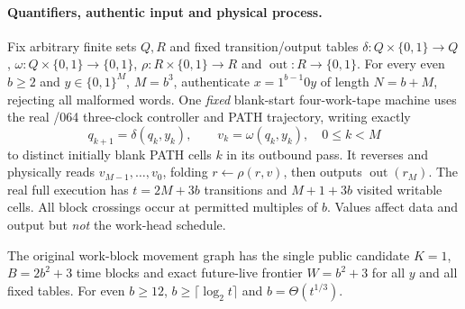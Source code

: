 \documentclass[11pt]{article}
\begin{document}
\paragraph{Quantifiers, authentic input and physical process.}
Fix arbitrary finite sets $Q,R$ and fixed transition/output tables
$\delta:Q\times\{0,1\}\to Q$,
$\omega:Q\times\{0,1\}\to\{0,1\}$,
$\rho:R\times\{0,1\}\to R$ and
$\operatorname{out}:R\to\{0,1\}$. For every even $b\ge2$ and
$y\in\{0,1\}^{M}$, $M=b^3$, authenticate
$x=1^{b-1}0y$ of length $N=b+M$, rejecting all malformed words.
One \emph{fixed} blank-start four-work-tape machine uses the real
/064 three-clock controller and PATH trajectory, writing exactly
\[
q_{k+1}=\delta(q_k,y_k),\qquad
v_k=\omega(q_k,y_k),\quad 0\le k<M
\]
to distinct initially blank PATH cells $k$ in its outbound pass.
It reverses and physically reads $v_{M-1},\ldots,v_0$,
folding $r\leftarrow\rho(r,v)$, then outputs
$\operatorname{out}(r_M)$. The real full execution has
$t=2M+3b$ transitions and $M+1+3b$ visited writable cells.
All block crossings occur at permitted multiples of $b$.
Values affect data and output but \emph{not} the work-head schedule.

The original work-block movement graph has the single public
candidate $K=1$, $B=2b^2+3$ time blocks and exact
future-live frontier $W=b^2+3$ for all $y$ and all fixed tables.
For even $b\ge12$, $b\ge\lceil\log_2t\rceil$ and
$b=\Theta(t^{1/3})$.
\end{document}

